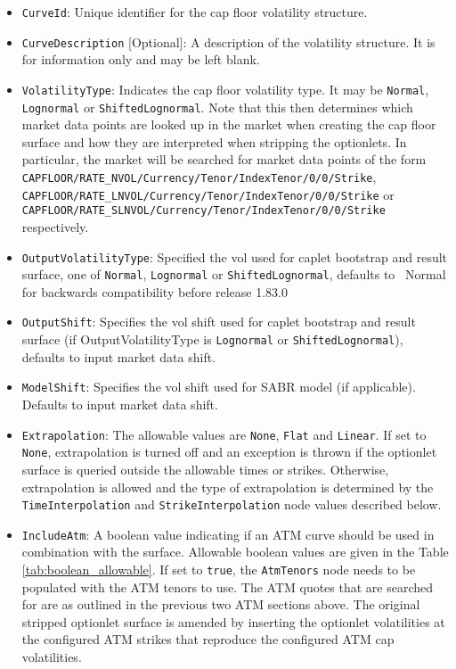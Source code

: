 \begin{itemize}
\item
\lstinline!CurveId!: Unique identifier for the cap floor volatility structure.

\item \lstinline!CurveDescription! [Optional]:
A description of the volatility structure. It is for information only and may be left blank.

\item \lstinline!VolatilityType!:
Indicates the cap floor volatility type. It may be \lstinline!Normal!, \lstinline!Lognormal! or \lstinline!ShiftedLognormal!. Note that this then determines which market data points are looked up in the market when creating the cap floor surface and how they are interpreted when stripping the optionlets. In particular, the market will be searched for market data points of the form \lstinline!CAPFLOOR/RATE_NVOL/Currency/Tenor/IndexTenor/0/0/Strike!, \lstinline!CAPFLOOR/RATE_LNVOL/Currency/Tenor/IndexTenor/0/0/Strike! or \lstinline!CAPFLOOR/RATE_SLNVOL/Currency/Tenor/IndexTenor/0/0/Strike! respectively.

\item \lstinline!OutputVolatilityType!: Specified the vol used for caplet bootstrap and result surface, one of {\tt Normal},
  {\tt Lognormal} or {\tt ShiftedLognormal}, defaults to {\ Normal} for backwards compatibility before release 1.83.0

\item \lstinline!OutputShift!: Specifies the vol shift used for caplet bootstrap and result surface (if OutputVolatilityType is 
{\tt Lognormal} or {\tt ShiftedLognormal}), defaults to input market data shift. 

\item \lstinline!ModelShift!: Specifies the vol shift used for SABR model (if applicable). Defaults to input market data shift. 

\item \lstinline!Extrapolation!:
The allowable values are \lstinline!None!, \lstinline!Flat! and \lstinline!Linear!. If set to \lstinline!None!, extrapolation is turned off and an exception is thrown if the optionlet surface is queried outside the allowable times or strikes. Otherwise, extrapolation is allowed and the type of extrapolation is determined by the \lstinline!TimeInterpolation! and \lstinline!StrikeInterpolation! node values described below.

\item \lstinline!IncludeAtm!:
A boolean value indicating if an ATM curve should be used in combination with the surface. Allowable boolean values are given in the Table \ref{tab:boolean_allowable}. If set to \lstinline!true!, the \lstinline!AtmTenors! node needs to be populated with the ATM tenors to use. The ATM quotes that are searched for are as outlined in the previous two ATM sections above. The original stripped optionlet surface is amended by inserting the optionlet volatilities at the configured ATM strikes that reproduce the configured ATM cap volatilities.


\end{itemize}
